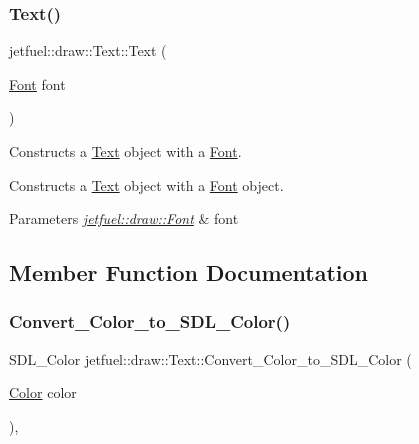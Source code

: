 \subsubsection{\texorpdfstring{Text()}{Text()}\hspace{0.1cm}{\footnotesize\ttfamily [2/2]}}
{\footnotesize\ttfamily jetfuel\+::draw\+::\+Text\+::\+Text (\begin{DoxyParamCaption}\item[{\hyperlink{classjetfuel_1_1draw_1_1Font}{Font}}]{font }\end{DoxyParamCaption})}



Constructs a \hyperlink{classjetfuel_1_1draw_1_1Text}{Text} object with a \hyperlink{classjetfuel_1_1draw_1_1Font}{Font}. 

Constructs a \hyperlink{classjetfuel_1_1draw_1_1Text}{Text} object with a \hyperlink{classjetfuel_1_1draw_1_1Font}{Font} object.


\begin{DoxyParams}{Parameters}
{\em \hyperlink{classjetfuel_1_1draw_1_1Font}{jetfuel\+::draw\+::\+Font}} & font \\
\hline
\end{DoxyParams}


\subsection{Member Function Documentation}
\mbox{\label{classjetfuel_1_1draw_1_1Text_a86075093466a1a7feef9675694e5b014}} 
\subsubsection{\texorpdfstring{Convert\+\_\+\+Color\+\_\+to\+\_\+\+S\+D\+L\+\_\+\+Color()}{Convert\_Color\_to\_SDL\_Color()}}
{\footnotesize\ttfamily S\+D\+L\+\_\+\+Color jetfuel\+::draw\+::\+Text\+::\+Convert\+\_\+\+Color\+\_\+to\+\_\+\+S\+D\+L\+\_\+\+Color (\begin{DoxyParamCaption}\item[{\hyperlink{classjetfuel_1_1draw_1_1Color}{Color}}]{color }\end{DoxyParamCaption})\hspace{0.3cm}{\ttfamily [inline]}, {\ttfamily [protected]}}



